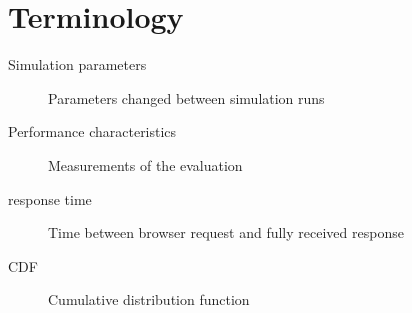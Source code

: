 \documentclass[
10pt, %
a4paper, %
oneside, %
headinclude,footinclude, %
BCOR5mm, %
]{scrartcl}
\begin{document}
\section{Terminology}
\begin{description}
\item[Simulation parameters] Parameters changed between simulation runs
\item[Performance characteristics] Measurements of the evaluation
\item[response time] Time between browser request and fully received response
\item[CDF] Cumulative distribution function
\end{description}

\listoffigures %

\listoftables %



\renewcommand{\refname}{\spacedlowsmallcaps{References}} %




\end{document}
